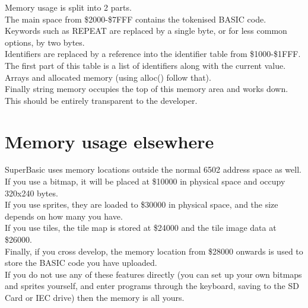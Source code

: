 Memory usage is split into 2 parts. \\

The main space from \$2000-\$7FFF contains the tokenised BASIC code. Keywords such as REPEAT are replaced by a single byte, or for less common options, by two bytes.\\ 

Identifiers are replaced by a reference into the identifier table from \$1000-\$1FFF. The first part of this table is a list of identifiers along with the current value.\\

Arrays and allocated memory (using alloc() follow that).\\

Finally string memory occupies the top of this memory area and works down.\\

This should be entirely transparent to the developer.

\section{Memory usage elsewhere}

SuperBasic uses memory locations outside the normal 6502 address space as well. \\

If you use a bitmap, it will be placed at \$10000 in physical space and occupy 320x240 bytes.\\

If you use sprites, they are loaded to \$30000 in physical space, and the size depends on how many you have.\\

If you use tiles, the tile map is stored at \$24000 and the tile image data at \$26000. \\

Finally, if you cross develop, the memory location from \$28000 onwards is used to store the BASIC code you have uploaded.\\

If you do not use any of these features directly (you can set up your own bitmaps and sprites yourself, and enter programs through the keyboard, saving to the SD Card or IEC drive) then the memory is all yours.
